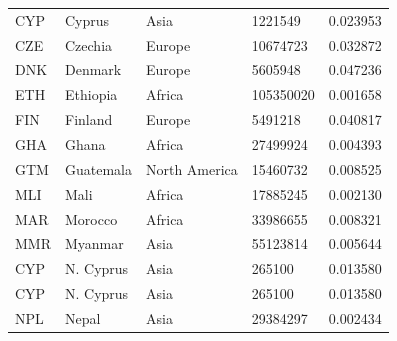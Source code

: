 \documentclass[11pt]{report}
\begin{document}
\begin{table}[h!]
\begin{tabular}{lllll}
            CYP                           & Cyprus                    & Asia                           & 1221549                       & 0.023953                           \\
            CZE                           & Czechia                   & Europe                         & 10674723                      & 0.032872                           \\
            DNK                           & Denmark                   & Europe                         & 5605948                       & 0.047236                           \\
            ETH                           & Ethiopia                  & Africa                         & 105350020                     & 0.001658                           \\
            FIN                           & Finland                   & Europe                         & 5491218                       & 0.040817                           \\
            GHA                           & Ghana                     & Africa                         & 27499924                      & 0.004393                           \\
            GTM                           & Guatemala                 & North America                  & 15460732                      & 0.008525                           \\
            MLI                           & Mali                      & Africa                         & 17885245                      & 0.002130                           \\
            MAR                           & Morocco                   & Africa                         & 33986655                      & 0.008321                           \\
            MMR                           & Myanmar                   & Asia                           & 55123814                      & 0.005644                           \\
            CYP                           & N. Cyprus                 & Asia                           & 265100                        & 0.013580                           \\
            CYP                           & N. Cyprus                 & Asia                           & 265100                        & 0.013580                           \\
            NPL                           & Nepal                     & Asia                           & 29384297                      & 0.002434                           \\

\end{tabular}
\end{table}
\end{document}
